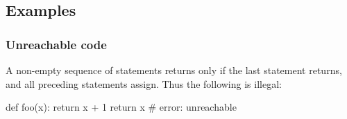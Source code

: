 \subsection{Examples}

\subsubsection{Unreachable code}
\label{sec:unreachable}
A non-empty sequence of statements returns only if the last statement returns, and all preceding statements
assign. Thus the following is illegal:

\begin{python}
def foo(x):
  return x + 1
  return x    # error: unreachable
\end{python}
